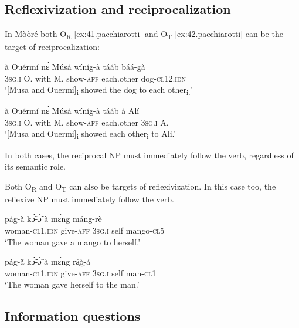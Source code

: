 \documentclass[output=paper]{langsci/langscibook}
\begin{document}
\subsection{Reflexivization and reciprocalization}\label{§5.4:reflexivization.pacchiarotti}

In M\`{o}\`{o}r\'{e} both O\textsubscript{R} \ref{ex:41.pacchiarotti} and O\textsubscript{T} \ref{ex:42.pacchiarotti} can be the target of reciprocalization:

\ea
\label{ex:41.pacchiarotti}
\gll \`{a}    Ou\'{e}rm\'{i}  nɛ́  M\'{u}s\'{a}  w\'{i}n\'{i}g-\`{a}  t\'{a}\'{a}b    b\'{a}\'{a}-g\`{\~{a}} \\
\textsc{3sg.i  }  O.    with  M.  show-\textsc{aff}  each.other  dog-\textsc{cl12.idn}\\
\glt `[Musa and Ouermi]\textsubscript{i} showed the dog to each other\textsubscript{i.}'
\z

\ea
\label{ex:42.pacchiarotti}
\gll \`{a}    Ou\'{e}rm\'{i}  nɛ́  M\'{u}s\'{a}  w\'{i}n\'{i}g-\`{a}  t\'{a}\'{a}b    \`{a}    Al\'{i}\\
\textsc{3sg.i    }O.    with  M.  show-\textsc{aff}  each.other  \textsc{3sg.i  }   A.\\
\glt `[Musa and Ouermi]\textsubscript{i} showed each other\textsubscript{i} to Ali.'
\z

In both cases, the reciprocal NP must immediately follow the verb, regardless of its semantic role. 

Both O\textsubscript{R }and O\textsubscript{T} can also be targets of reflexivization. In this case too, the reflexive NP must immediately follow the verb.

\ea
\label{ex:43.pacchiarotti}
\gll p\'{a}g-\`{\~{a}} kɔ̃́-ɔ̃̀ \`{a} mɛ́ng m\'{a}ng-r\`{e}\\
woman-\textsc{cl1.idn}  give-\textsc{aff}  \textsc{3sg.i  }  self  mango-\textsc{cl5}\\
\glt `The woman gave a mango to herself.'
\z

\ea
\label{ex:44.pacchiarotti}
\gll p\'{a}g-\`{\~{a}} kɔ̃́-ɔ̃̀ \`{a} mɛ́ng rà͜ò-\'{a} \\
woman-\textsc{cl1.idn}  give-\textsc{aff}  \textsc{3sg.i  }  self  man-\textsc{cl1}\\
\glt `The woman gave herself to the man.'
\z

\subsection{Information questions}\label{§5.5:Information.pacchiarotti}
\end{document}

